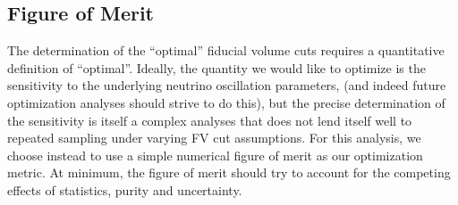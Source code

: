 \subsection{Figure of Merit}
\label{subsec:metric}


The determination of the ``optimal'' fiducial volume cuts requires a
quantitative definition of ``optimal''.  Ideally, the quantity we would like to
optimize is the sensitivity to the underlying neutrino oscillation parameters,
(and indeed future optimization analyses should strive to do this), but the
precise determination of the sensitivity is itself a complex analyses that does
not lend itself well to repeated sampling under varying FV cut assumptions.
For this analysis, we choose instead to use a simple numerical figure of merit
as our optimization metric.  At minimum, the figure of merit should try to
account for the competing effects of statistics, purity and uncertainty. 

